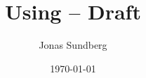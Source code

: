 \documentclass[a4paper,11pt,titlepage,draft]{article}
\title{Using \strsafe -- Draft}
\date{\today}
\author{Jonas Sundberg}
\begin{document}
\maketitle

\begin{abstract}

\end{abstract}

\tableofcontents
\clearpage




\end{document}
